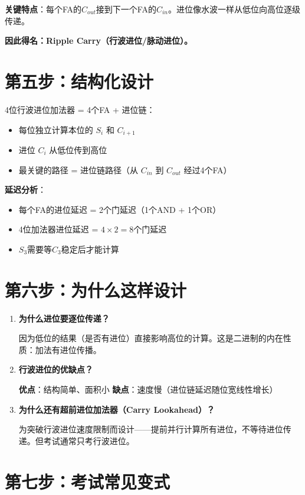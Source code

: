 \textbf{关键特点}：每个FA的$C_{out}$接到下一个FA的$C_{in}$。进位像水波一样从低位向高位逐级传递。

\textbf{因此得名：Ripple Carry（行波进位/脉动进位）。}

\section{第五步：结构化设计}

4位行波进位加法器 = 4个FA + 进位链：

\begin{itemize}
  \item 每位独立计算本位的 $S_i$ 和 $C_{i+1}$
  \item 进位 $C_i$ 从低位传到高位
  \item 最关键的路径 = 进位链路径（从 $C_{in}$ 到 $C_{out}$ 经过4个FA）
\end{itemize}

\textbf{延迟分析}：
\begin{itemize}
  \item 每个FA的进位延迟 = 2个门延迟（1个AND + 1个OR）
  \item 4位加法器进位延迟 = $4 \times 2 = 8$个门延迟
  \item $S_3$需要等$C_3$稳定后才能计算
\end{itemize}

\section{第六步：为什么这样设计}

\begin{enumerate}
  \item \textbf{为什么进位要逐位传递？}

  因为低位的结果（是否有进位）直接影响高位的计算。这是二进制的内在性质：加法有进位传播。

  \item \textbf{行波进位的优缺点？}

  \textbf{优点}：结构简单、面积小
  \textbf{缺点}：速度慢（进位链延迟随位宽线性增长）

  \item \textbf{为什么还有超前进位加法器（Carry Lookahead）？}

  为突破行波进位速度限制而设计——提前并行计算所有进位，不等待进位传递。但考试通常只考行波进位。
\end{enumerate}

\section{第七步：考试常见变式}

